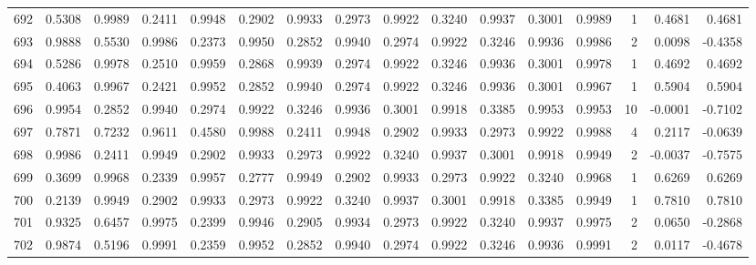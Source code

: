 \begin{tabular}{lrrrrrrrrrrrrrrr}
692 &      0.5308 &  0.9989 &  0.2411 &  0.9948 &  0.2902 &  0.9933 &  0.2973 &  0.9922 &  0.3240 &  0.9937 &   0.3001 &     0.9989 &      1 &                    0.4681 &                     0.4681 \\
693 &      0.9888 &  0.5530 &  0.9986 &  0.2373 &  0.9950 &  0.2852 &  0.9940 &  0.2974 &  0.9922 &  0.3246 &   0.9936 &     0.9986 &      2 &                    0.0098 &                    -0.4358 \\
694 &      0.5286 &  0.9978 &  0.2510 &  0.9959 &  0.2868 &  0.9939 &  0.2974 &  0.9922 &  0.3246 &  0.9936 &   0.3001 &     0.9978 &      1 &                    0.4692 &                     0.4692 \\
695 &      0.4063 &  0.9967 &  0.2421 &  0.9952 &  0.2852 &  0.9940 &  0.2974 &  0.9922 &  0.3246 &  0.9936 &   0.3001 &     0.9967 &      1 &                    0.5904 &                     0.5904 \\
696 &      0.9954 &  0.2852 &  0.9940 &  0.2974 &  0.9922 &  0.3246 &  0.9936 &  0.3001 &  0.9918 &  0.3385 &   0.9953 &     0.9953 &     10 &                   -0.0001 &                    -0.7102 \\
697 &      0.7871 &  0.7232 &  0.9611 &  0.4580 &  0.9988 &  0.2411 &  0.9948 &  0.2902 &  0.9933 &  0.2973 &   0.9922 &     0.9988 &      4 &                    0.2117 &                    -0.0639 \\
698 &      0.9986 &  0.2411 &  0.9949 &  0.2902 &  0.9933 &  0.2973 &  0.9922 &  0.3240 &  0.9937 &  0.3001 &   0.9918 &     0.9949 &      2 &                   -0.0037 &                    -0.7575 \\
699 &      0.3699 &  0.9968 &  0.2339 &  0.9957 &  0.2777 &  0.9949 &  0.2902 &  0.9933 &  0.2973 &  0.9922 &   0.3240 &     0.9968 &      1 &                    0.6269 &                     0.6269 \\
700 &      0.2139 &  0.9949 &  0.2902 &  0.9933 &  0.2973 &  0.9922 &  0.3240 &  0.9937 &  0.3001 &  0.9918 &   0.3385 &     0.9949 &      1 &                    0.7810 &                     0.7810 \\
701 &      0.9325 &  0.6457 &  0.9975 &  0.2399 &  0.9946 &  0.2905 &  0.9934 &  0.2973 &  0.9922 &  0.3240 &   0.9937 &     0.9975 &      2 &                    0.0650 &                    -0.2868 \\
702 &      0.9874 &  0.5196 &  0.9991 &  0.2359 &  0.9952 &  0.2852 &  0.9940 &  0.2974 &  0.9922 &  0.3246 &   0.9936 &     0.9991 &      2 &                    0.0117 &                    -0.4678 \\

\end{tabular}
